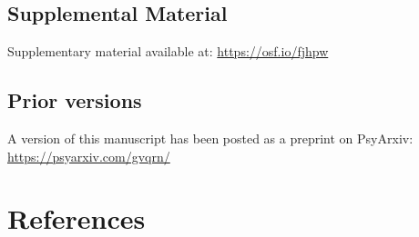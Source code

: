 \documentclass[
  ,apa7,floatsintext]{apa6}
\begin{document}
\hypertarget{supplemental-material}{%
\subsection{Supplemental Material}\label{supplemental-material}}

Supplementary material available at: \url{https://osf.io/fjhpw}

\hypertarget{prior-versions}{%
\subsection{Prior versions}\label{prior-versions}}

A version of this manuscript has been posted as a preprint on PsyArxiv: \url{https://psyarxiv.com/gvqrn/}

\hypertarget{references}{%
\section*{References}\label{references}}
\end{document}
